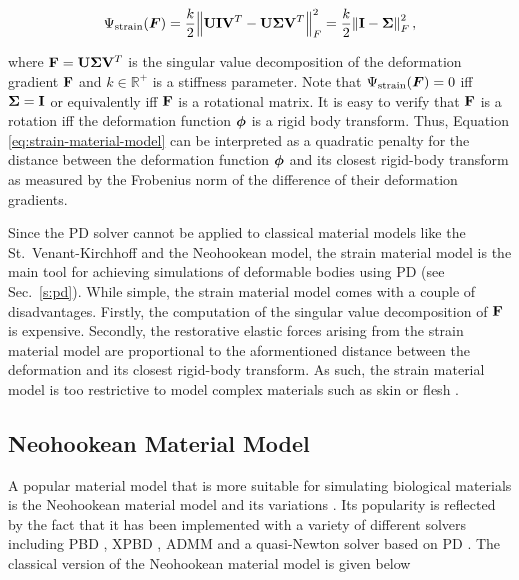 \begin{equation}\label{eq:strain-material-model}
    \Psi_{\text{strain}}(\bm{F}) = \frac{k}{2} \norm{\mathbf{U}\mathbf{I}\mathbf{V}^T - \mathbf{U}\mathbf{\Sigma}\mathbf{V}^T}^2_F 
    = \frac{k}{2} \norm{\mathbf{I} - \mathbf{\Sigma}}^2_F,
\end{equation}

\noindent where $\mathbf{F} = \mathbf{U}\mathbf{\Sigma}\mathbf{V}^T$ is the singular value decomposition of the deformation gradient $\mathbf{F}$ and $k 
\in \mathbb{R}^+$ is a stiffness parameter. Note that $\Psi_{\text{strain}}(\bm{F}) = 0$ iff $\mathbf{\Sigma} = \mathbf{I}$ or equivalently iff 
$\mathbf{F}$ is a rotational matrix. It is easy to verify that $\mathbf{F}$ is a rotation iff the deformation function $\bm{\phi}$ is a rigid body 
transform. Thus, Equation \ref{eq:strain-material-model} can be interpreted as a quadratic penalty for the distance between the 
deformation function $\bm{\phi}$ and its closest rigid-body transform as measured by the Frobenius norm of the difference of their deformation 
gradients. 

Since the PD solver cannot be applied to classical material models like the St.\ Venant-Kirchhoff and the Neohookean model, the strain 
material model is the main tool for achieving simulations of deformable bodies using PD (see Sec.\ \ref{s:pd}).
While simple, the strain material model comes with a couple of disadvantages. Firstly, the computation of the singular value decomposition of 
$\mathbf{F}$ is expensive. Secondly, the restorative elastic forces arising from the strain material model are proportional 
to the aformentioned distance between the deformation and its closest rigid-body transform. As such, the strain material model is too 
restrictive to model complex materials such as skin or flesh \cite{liu2017}. 

\subsection{Neohookean Material Model}\label{ss:neohookean-material}
A popular material model that is more suitable for simulating biological materials is the Neohookean material model and its variations 
\cite{smith2018}. Its popularity is reflected by the fact that it has been implemented with a variety of different solvers including 
PBD \cite{bender2014}, XPBD \cite{macklin2021}, ADMM \cite{overby2017} and a quasi-Newton solver based on PD \cite{liu2017}.
The classical version of the Neohookean material model is given below

